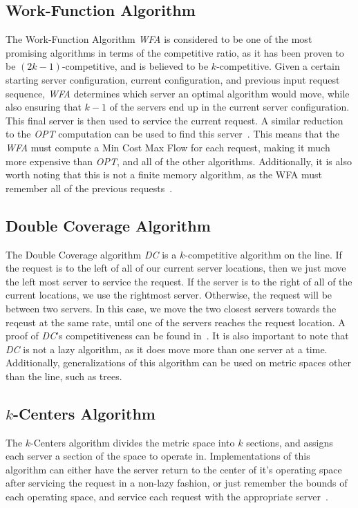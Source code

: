 \subsection{Work-Function Algorithm}
\label{sec:WFA}
The Work-Function Algorithm \textit{WFA} is considered to be one of the most promising algorithms in terms of the competitive ratio, as it has been proven to be $(2k-1)$-competitive, and is believed to be $k$-competitive. Given a certain starting server configuration, current configuration, and previous input request sequence, \textit{WFA} determines which server an optimal algorithm would move, while also ensuring that $k-1$ of the servers end up in the current server configuration. This final server is then used to service the current request. A similar reduction to the \textit{OPT} computation can be used to find this server~\cite{WFA2009}. This means that the \textit{WFA} must compute a Min Cost Max Flow for each request, making it much more expensive than \textit{OPT}, and all of the other algorithms. Additionally, it is also worth noting that this is not a finite memory algorithm, as the WFA must remember all of the previous requests~\cite{MAXMAX2005}. 

\subsection{Double Coverage Algorithm}
\label{sec:DC}
The Double Coverage algorithm \textit{DC} is a $k$-competitive algorithm on the line. If the request is to the left of all of our current server locations, then we just move the left most server to service the request. If the server is to the right of all of the current locations, we use the rightmost server. Otherwise, the request will be between two servers. In this case, we move the two closest servers towards the reqeust at the same rate, until one of the servers reaches the request location. A proof of \textit{DC}'s competitiveness can be found in~\cite{OnlineComp1998}. It is also important to note that \textit{DC} is not a lazy algorithm, as it does move more than one server at a time. Additionally, generalizations of this algorithm can be used on metric spaces other than the line, such as trees.

\subsection{$k$-Centers Algorithm}
\label{sec:KC}
The $k$-Centers algorithm divides the metric space into $k$ sections, and assigns each server a section of the space to operate in. Implementations of this algorithm can either have the server return to the center of it's operating space after servicing the request in a non-lazy fashion, or just remember the bounds of each operating space, and service each request with the appropriate server~\cite{bij2016}.